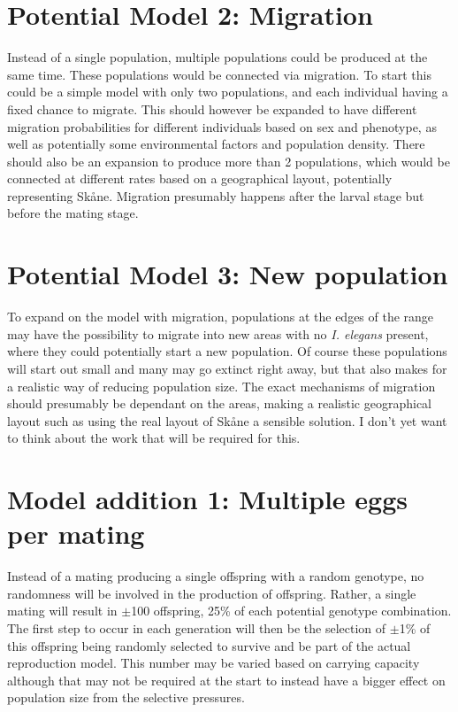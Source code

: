 \documentclass{article}
\begin{document}
\section{Potential Model 2: Migration}
Instead of a single population, multiple populations could be produced at the same time. These populations would be connected via migration. To start this could be a simple model with only two populations, and each individual having a fixed chance to migrate. This should however be expanded to have different migration probabilities for different individuals based on sex and phenotype, as well as potentially some environmental factors and population density. There should also be an expansion to produce more than 2 populations, which would be connected at different rates based on a geographical layout, potentially representing Sk{\aa}ne. Migration presumably happens after the larval stage but before the mating stage.

\section{Potential Model 3: New population}
To expand on the model with migration, populations at the edges of the range may have the possibility to migrate into new areas with no \textit{I. elegans} present, where they could potentially start a new population. Of course these populations will start out small and many may go extinct right away, but that also makes for a realistic way of reducing population size. The exact mechanisms of migration should presumably be dependant on the areas, making a realistic geographical layout such as using the real layout of Sk{\aa}ne a sensible solution. I don't yet want to think about the work that will be required for this.

\section{Model addition 1: Multiple eggs per mating}
Instead of a mating producing a single offspring with a random genotype, no randomness will be involved in the production of offspring. Rather, a single mating will result in \(\pm\)100 offspring, 25\% of each potential genotype combination. The first step to occur in each generation will then be the selection of \(\pm\)1\% of this offspring being randomly selected to survive and be part of the actual reproduction model. This number may be varied based on carrying capacity although that may not be required at the start to instead have a bigger effect on population size from the selective pressures.
\end{document}

